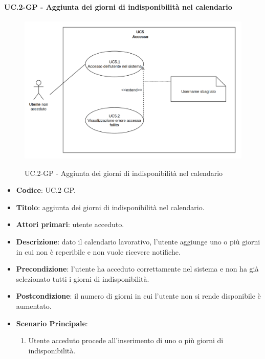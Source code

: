 		\paragraph{UC\theuccount.2-GP - Aggiunta dei giorni di indisponibilità nel calendario}
			\begin{figure}[H]
				\centering
				\includegraphics[width=\columnwidth]{img/UC5.png}\\
				\caption{UC\theuccount.2-GP - Aggiunta dei giorni di indisponibilità nel calendario}
			\end{figure}
			\begin{itemize}
				\item \textbf{Codice}: UC\theuccount.2-GP.
				\item \textbf{Titolo}: aggiunta dei giorni di indisponibilità nel calendario.
				\item \textbf{Attori primari}: utente acceduto.
				\item \textbf{Descrizione}: dato il calendario lavorativo, l’utente aggiunge uno o più
				giorni in cui non è reperibile e non vuole ricevere notifiche.
				\item \textbf{Precondizione}: l’utente ha acceduto correttamente nel sistema e non
				ha già selezionato tutti i giorni di indisponibilità.
				\item \textbf{Postcondizione}: il numero di giorni in cui l’utente non si rende disponibile è aumentato.
				\item \textbf{Scenario Principale}:
				\begin{enumerate}
					\item Utente acceduto procede all'inserimento di uno o più giorni di indisponibilità.
				\end{enumerate}
			\end{itemize}
		
